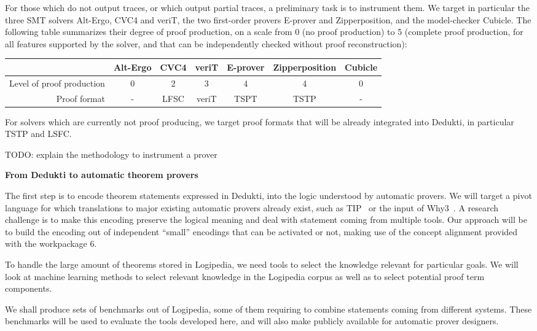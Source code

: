 For those which do not output traces, or which output partial traces, a
preliminary task is to instrument them. We target in particular the
three SMT solvers Alt-Ergo, CVC4 and veriT, the two first-order provers
E-prover and Zipperposition, and the model-checker Cubicle. The
following table summarizes their degree of proof production, on a scale
from 0 (no proof production) to 5 (complete proof production, for all
features supported by the solver, and that can be independently checked
without proof reconstruction):
%
\begin{center}
\begin{tabular}{|r|c|c|c|c|c|c|}
\hline
 & Alt-Ergo & CVC4 & veriT & E-prover & Zipperposition & Cubicle\\
\hline
Level of proof production & 0 & 2 & 3 & 4 & 4 & 0\\
\hline
Proof format & - & LFSC & veriT & TSPT & TSTP & -\\
\hline
\end{tabular}
\end{center}
%
For solvers which are currently not proof producing, we target proof
formats that will be already integrated into Dedukti, in particular TSTP
and LSFC.

TODO: explain the methodology to instrument a prover


{\bf \large From Dedukti to automatic theorem provers}

The first step is to encode theorem statements expressed in Dedukti,
into the logic understood by automatic provers. We will target a pivot
language for which translations to major existing automatic provers
already exist, such as TIP~\cite{DBLP:conf/mkm/ClaessenJRS15} or the
input of Why3~\cite{DBLP:conf/esop/FilliatreP13}. A research challenge
is to make this encoding preserve the logical meaning and deal with
statement coming from multiple tools. Our approach will be to build the
encoding out of independent ``small'' encodings that can be activated or
not, making use of the concept alignment provided with the workpackage
6.

To handle the large amount of theorems stored in Logipedia, we need
tools to select the knowledge relevant for particular goals. We will
look at machine learning methods to select relevant knowledge in the
Logipedia corpus as well as to select potential proof term components.

We shall produce sets of benchmarks out of Logipedia, some of them
requiring to combine statements coming from different systems. These
benchmarks will be used to evaluate the tools developed here, and will
also make publicly available for automatic prover designers.

